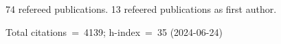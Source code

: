 74 refereed publications. 13 refeered publications as first author.

Total citations~=~4139; h-index~=~35 (2024-06-24)